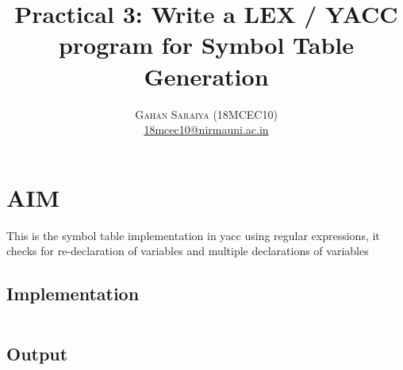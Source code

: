 \documentclass[paper=letter, fontsize=12pt]{article}
\date{}
\title{\vspace{-15mm}\fontsize{24pt}{10pt}\selectfont\textbf{Practical 3: Write a LEX / YACC program for Symbol Table Generation}} %
\author{
    \large
    {\textsc{Gahan Saraiya (18MCEC10)}}\\[2mm]
    \normalsize \href{mailto:18mcec10@nirmauni.ac.in}{18mcec10@nirmauni.ac.in}\\[2mm] %
}
\date{}
\begin{document}
    \maketitle %
    \thispagestyle{fancy} %
    \section{\LARGE AIM}
    This  is  the  symbol  table  implementation  in  yacc  using  regular  expressions,  it  checks  for re-declaration of variables and multiple declarations of variables
    
    \subsection{Implementation}
    \inputminted{c}{../practical.l}
    
    \subsection{Output}
    \inputminted{text}{../output.txt}
\end{document}
